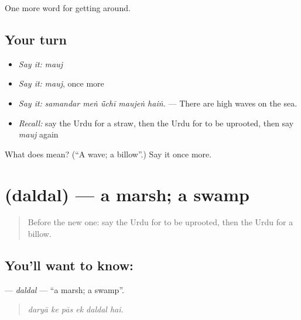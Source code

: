 \begin{grammarlens}[title={What you've built}]
One more word for getting around.
\end{grammarlens}

\subsection*{Your turn}
\begin{itemize}
\raggedright
  \item \emph{Say it:} \emph{mauj}
  \item \emph{Say it:} \emph{mauj}, once more
  \item \emph{Say it:} \emph{samandar meṅ ū̃chī maujeṅ haiṅ.} — There are high waves on the sea.
  \item \emph{Recall:} say the Urdu for a straw, then the Urdu for to be uprooted, then say \emph{mauj} again
\end{itemize}

\begin{tcolorbox}[breakable,colback=teal!4,colframe=teal!35!black,title={Before you move on}]
What does  mean? (\textquotedblleft{}A wave; a billow\textquotedblright{}.) Say it once more.
\end{tcolorbox}
\section[\texorpdfstring{\ur{دلدل} (daldal)}{دلدل (daldal)}]{ (daldal) — a marsh; a swamp}

\label{lesson:UR-C434-daldal}



\begin{quote}
Before the new one: say the Urdu for to be uprooted, then the Urdu for a billow.
\end{quote}

\subsection*{You'll want to know: }
\textbf{} — \emph{daldal} — \textquotedblleft{}a marsh; a swamp\textquotedblright{}.

\begin{quote}
     
\end{quote}

\begin{quote}
\emph{daryā ke pās ek daldal hai.}
\end{quote}

